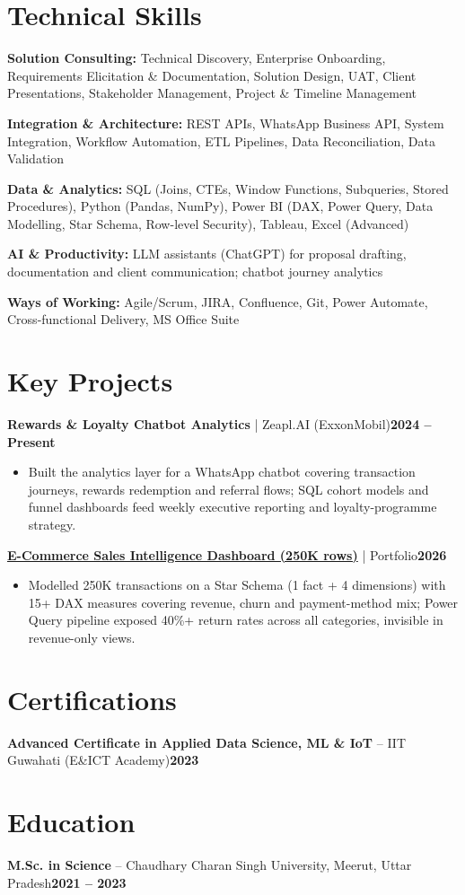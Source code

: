 \documentclass[a4paper,10pt]{article}
\newcommand{\headrow}[2]{%
  {\parfillskip=0pt\relax\rightskip=0pt\relax #1\hfill #2\par}%
}
\newcommand{\project}[3]{%
  \vspace{3pt}%
  \headrow{\textbf{#1} \textcolor{black!60}{| #2}}{\textbf{#3}}%
}
\newcommand{\skillline}[2]{\textbf{#1:} #2\par\vspace{1.5pt}}
\begin{document}
\section{Technical Skills}
{\small
\skillline{Solution Consulting}{Technical Discovery, Enterprise Onboarding, Requirements Elicitation \& Documentation, Solution Design, UAT, Client Presentations, Stakeholder Management, Project \& Timeline Management}
\skillline{Integration \& Architecture}{REST APIs, WhatsApp Business API, System Integration, Workflow Automation, ETL Pipelines, Data Reconciliation, Data Validation}
\skillline{Data \& Analytics}{SQL (Joins, CTEs, Window Functions, Subqueries, Stored Procedures), Python (Pandas, NumPy), Power BI (DAX, Power Query, Data Modelling, Star Schema, Row-level Security), Tableau, Excel (Advanced)}
\skillline{AI \& Productivity}{LLM assistants (ChatGPT) for proposal drafting, documentation and client communication; chatbot journey analytics}
\skillline{Ways of Working}{Agile/Scrum, JIRA, Confluence, Git, Power Automate, Cross-functional Delivery, MS Office Suite}
}

\section{Key Projects}

\project{Rewards \& Loyalty Chatbot Analytics}{Zeapl.AI (ExxonMobil)}{2024 -- Present}
\begin{itemize}
  \item Built the analytics layer for a WhatsApp chatbot covering transaction journeys, rewards redemption and referral flows; SQL cohort models and funnel dashboards feed weekly executive reporting and loyalty-programme strategy.
\end{itemize}

\project{\href{https://github.com/Mittal-99/ecommerce-powerbi-dashboard}{E-Commerce Sales Intelligence Dashboard (250K rows)}}{Portfolio}{2026}
\begin{itemize}
  \item Modelled 250K transactions on a Star Schema (1 fact + 4 dimensions) with 15+ DAX measures covering revenue, churn and payment-method mix; Power Query pipeline exposed 40\%+ return rates across all categories, invisible in revenue-only views.
\end{itemize}

\section{Certifications}
\headrow{\textbf{Advanced Certificate in Applied Data Science, ML \& IoT} -- IIT Guwahati (E\&ICT Academy)}{\textbf{2023}}

\section{Education}
\headrow{\textbf{M.Sc. in Science} -- Chaudhary Charan Singh University, Meerut, Uttar Pradesh}{\textbf{2021 -- 2023}}
\end{document}
